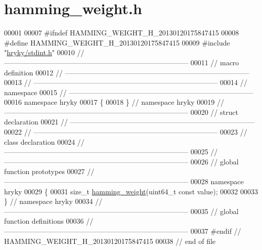\hypertarget{hamming__weight_8h_source}{\section{hamming\-\_\-weight.\-h}
}

\begin{DoxyCode}
00001 
00007 \textcolor{preprocessor}{#ifndef HAMMING\_WEIGHT\_H\_20130120175847415}
00008 \textcolor{preprocessor}{}\textcolor{preprocessor}{#define HAMMING\_WEIGHT\_H\_20130120175847415}
00009 \textcolor{preprocessor}{}\textcolor{preprocessor}{#include "\hyperlink{stdint_8h}{hryky/stdint.h}"}
00010 \textcolor{comment}{//
      ------------------------------------------------------------------------------}
00011 \textcolor{comment}{// macro definition}
00012 \textcolor{comment}{//
      ------------------------------------------------------------------------------}
00013 \textcolor{comment}{//
      ------------------------------------------------------------------------------}
00014 \textcolor{comment}{// namespace}
00015 \textcolor{comment}{//
      ------------------------------------------------------------------------------}
00016 \textcolor{keyword}{namespace }hryky
00017 \{
00018 \} \textcolor{comment}{// namespace hryky}
00019 \textcolor{comment}{//
      ------------------------------------------------------------------------------}
00020 \textcolor{comment}{// struct declaration}
00021 \textcolor{comment}{//
      ------------------------------------------------------------------------------}
00022 \textcolor{comment}{//
      ------------------------------------------------------------------------------}
00023 \textcolor{comment}{// class declaration}
00024 \textcolor{comment}{//
      ------------------------------------------------------------------------------}
00025 \textcolor{comment}{//
      ------------------------------------------------------------------------------}
00026 \textcolor{comment}{// global function prototypes}
00027 \textcolor{comment}{//
      ------------------------------------------------------------------------------}
00028 \textcolor{keyword}{namespace }hryky
00029 \{
00031     \textcolor{keywordtype}{size\_t} \hyperlink{namespacehryky_a265f8a87bd7b6cb78967dd5e49c49444}{hamming_weight}(uint64\_t \textcolor{keyword}{const} value);
00032 
00033 \} \textcolor{comment}{// namespace hryky}
00034 \textcolor{comment}{//
      ------------------------------------------------------------------------------}
00035 \textcolor{comment}{// global function definitions}
00036 \textcolor{comment}{//
      ------------------------------------------------------------------------------}
00037 \textcolor{preprocessor}{#endif // HAMMING\_WEIGHT\_H\_20130120175847415}
00038 \textcolor{preprocessor}{}\textcolor{comment}{// end of file}
\end{DoxyCode}
